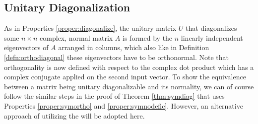 \subsection{Unitary Diagonalization}

As in Properties \ref{proper:diagonalize}, the unitary matrix $U$ that diagonalizes some $n \times n$ complex, normal matrix $A$ is formed by the $n$ linearly independent eigenvectors of $A$ arranged in columns, which also like in Definition \ref{defn:orthodiagonal} these eigenvectors have to be orthonormal. Note that orthogonality is now defined with respect to the complex dot product which has a complex conjugate applied on the second input vector. To show the equivalence between a matrix being unitary diagonalizable and its normality, we can of course follow the similar steps in the proof of Theorem \ref{thm:symdiag} that uses Properties \ref{proper:symortho} and \ref{proper:symnodefic}. However, an alternative approach of utilizing the  will be adopted here.

